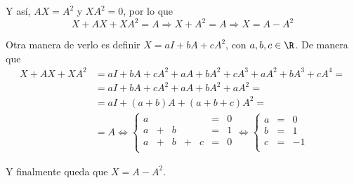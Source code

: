 \documentclass[../../main.tex]{subfiles}
\begin{document}
  Y así, $A X = A^2$ y $X A^2 = 0$, por lo que
  $$
  X + A X + X A^2 = A \Longrightarrow X + A^2 = A \Longrightarrow X = A - A^2
  $$

  Otra manera de verlo es definir $X = a I + b A + c A^2$, con $a, b, c \in \R$. De manera que
  \begin{equation*}
    \begin{split}
      X + A X + X A^2 & =
      a I + b A + c A^2 + a A + b A^2 + c A^3 + a A^2 + b A^3 + c A^4 = \\ & =
      a I + b A + c A^2 + a A + b A^2 + a A^2 = \\ & =
      a I + (a + b) A + (a + b + c) A^2 = \\ & = A \iff
      \left \{
        \begin{matrix}
          a &   &   &   &   & = & 0 \\
          a & + & b &   &   & = & 1 \\
          a & + & b & + & c & = & 0 \\
        \end{matrix}
      \right . \iff \left \{
        \begin{matrix}
          a & = &  0 \\
          b & = &  1 \\
          c & = & -1 \\
        \end{matrix}
      \right .
    \end{split}
  \end{equation*}

  Y finalmente queda que $X = A - A^2$.
\end{document}
